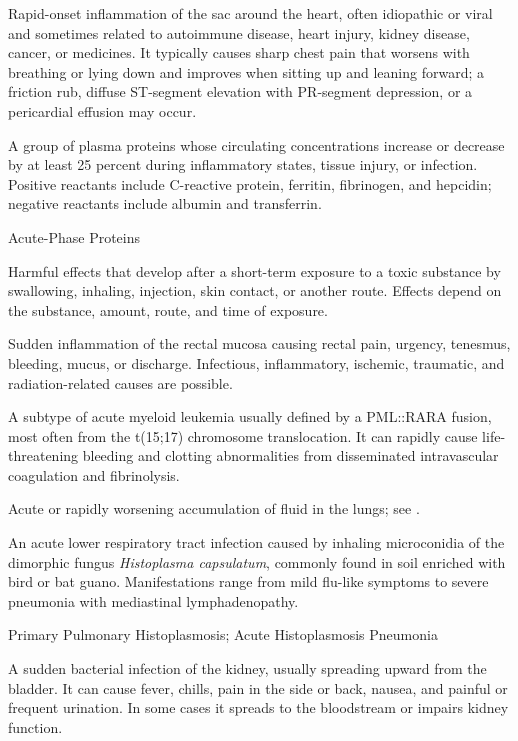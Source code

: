  Rapid-onset inflammation of the sac around the heart, often idiopathic or viral and sometimes related to autoimmune disease, heart injury, kidney disease, cancer, or medicines. It typically causes sharp chest pain that worsens with breathing or lying down and improves when sitting up and leaning forward; a friction rub, diffuse ST-segment elevation with PR-segment depression, or a pericardial effusion may occur.

 A group of plasma proteins whose circulating concentrations increase or decrease by at least 25 percent during inflammatory states, tissue injury, or infection. Positive reactants include C-reactive protein, ferritin, fibrinogen, and hepcidin; negative reactants include albumin and transferrin.

\synonyms
Acute-Phase Proteins

 Harmful effects that develop after a short-term exposure to a toxic substance by swallowing, inhaling, injection, skin contact, or another route. Effects depend on the substance, amount, route, and time of exposure.

 Sudden inflammation of the rectal mucosa causing rectal pain, urgency, tenesmus, bleeding, mucus, or discharge. Infectious, inflammatory, ischemic, traumatic, and radiation-related causes are possible.

 A subtype of acute myeloid leukemia usually defined by a PML::RARA fusion, most often from the t(15;17) chromosome translocation. It can rapidly cause life-threatening bleeding and clotting abnormalities from disseminated intravascular coagulation and fibrinolysis.

 Acute or rapidly worsening accumulation of fluid in the lungs; see .

 An acute lower respiratory tract infection caused by inhaling microconidia of the dimorphic fungus \textit{Histoplasma capsulatum}, commonly found in soil enriched with bird or bat guano. Manifestations range from mild flu-like symptoms to severe pneumonia with mediastinal lymphadenopathy.

\synonyms
Primary Pulmonary Histoplasmosis; Acute Histoplasmosis Pneumonia

 A sudden bacterial infection of the kidney, usually spreading upward from the bladder. It can cause fever, chills, pain in the side or back, nausea, and painful or frequent urination. In some cases it spreads to the bloodstream or impairs kidney function.

